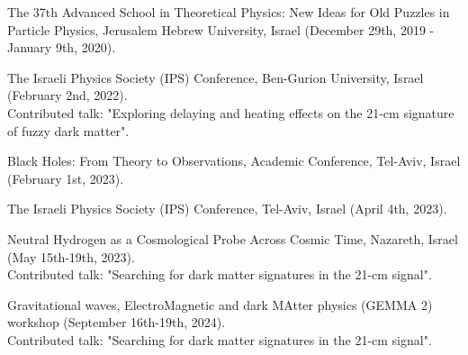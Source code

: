 \documentclass[letterpaper,12pt]{article}
\def\footerlink{}
\renewenvironment{itemize}{
  \begin{list}{}{
    \setlength{\leftmargin}{1.5em}
  }
}{
  \end{list}
}
\begin{document}
\begin{itemize}
	\item The 37th Advanced School in Theoretical Physics: New Ideas for Old Puzzles in Particle Physics, Jerusalem Hebrew University, Israel (December 29th, 2019 - January 9th, 2020).
	\item The Israeli Physics Society (IPS) Conference, Ben-Gurion University, Israel (February 2nd, 2022).\\
		Contributed talk: "Exploring delaying and heating effects on the 21-cm signature of fuzzy dark matter".
	\item Black Holes: From Theory to Observations, Academic Conference, Tel-Aviv, Israel (February 1st, 2023).
	\item The Israeli Physics Society (IPS) Conference, Tel-Aviv, Israel (April 4th, 2023).
	\item Neutral Hydrogen as a Cosmological Probe Across Cosmic Time, Nazareth, Israel (May 15th-19th, 2023).\\
		Contributed talk: "Searching for dark matter signatures in the 21-cm signal".
	\item Gravitational waves, ElectroMagnetic and dark MAtter physics (GEMMA 2) workshop (September 16th-19th, 2024).\\
		Contributed talk: "Searching for dark matter signatures in the 21-cm signal". 
\end{itemize}


\end{document}
